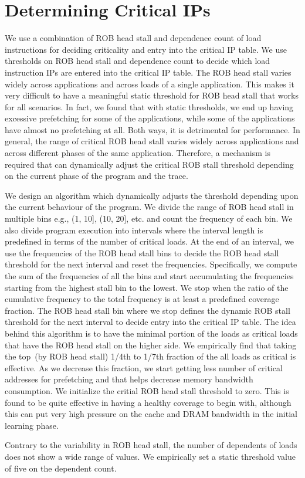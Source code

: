 \section{Determining Critical IPs}\label{Crritical IP}
We use a combination of ROB head stall and dependence count of load instructions for deciding criticality and entry into the critical IP table. We use thresholds on ROB head stall and dependence count to decide which load instruction IPs are entered into the critical IP table.
The ROB head stall varies widely across applications and across loads of a single application. This makes it very difficult to have a meaningful static threshold for ROB head stall that works for all scenarios. In fact, we found that with static thresholds, we end up
having excessive prefetching for some of the applications, while some of the applications have almost no prefetching at all. Both ways, it is detrimental for performance. In general, the range of critical ROB head stall varies widely across applications and across different phases of the same application. Therefore, 
a mechanism is required that can dynamically adjust the critical ROB stall threshold depending on the current phase of the program and the trace.

We design an algorithm which dynamically adjusts the threshold depending upon the current behaviour of the program. We divide the range of ROB head stall in multiple bins e.g., (1, 10], (10, 20], etc. and count the frequency of each bin.
We also divide program execution into intervals where the interval length is predefined in terms of the number of critical loads. At the end of an interval, we use the frequencies of the ROB head stall bins to decide the ROB head stall threshold for the next interval and reset the frequencies. Specifically, 
we compute the sum of the frequencies of all the bins and start accumulating the frequencies starting from the highest stall bin to the lowest. We stop when the ratio of the cumulative frequency to the total frequency is at least a predefined coverage fraction. The ROB head stall bin where we stop defines the dynamic ROB stall threshold for the next interval to decide entry into the critical IP table.
The idea behind this algorithm is to have the minimal portion of the loads as critical loads that have the ROB head stall on the higher side. We empirically find that taking the top~(by ROB head stall) 1/4th to 1/7th fraction of the all loads as critical is effective. As we decrease this fraction, we start getting less number of critical addresses for prefetching and that helps decrease memory bandwidth consumption. We initialize the critial ROB head stall threshold to zero. This is found to be quite effective in having a healthy coverage to begin with, although this can put very high pressure on the cache and DRAM bandwidth in the initial learning phase.

Contrary to the variability in ROB head stall, the number of dependents of loads does not show a wide range of values. We empirically set a static threshold value of five on the dependent count.